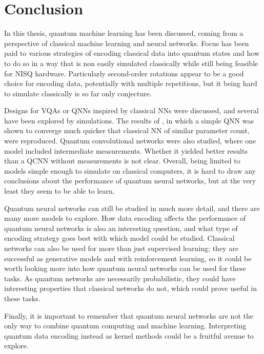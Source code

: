 \chapter{Conclusion}
\label{chap:conclusion}
In this thesis, quantum machine learning has been discussed, coming from a perspective of classical machine learning and neural networks.
Focus has been paid to various strategies of encoding classical data into quantum states and how to do so in a way that is non easily simulated classically while still being feasible for NISQ hardware.
Particularly second-order rotations appear to be a good choice for encoding data, potentially with multiple repetitions, but it being hard to simulate classically is so far only conjecture.

Designs for VQAs or QNNs inspired by classical NNs were discussed, and several have been explored by simulations.
The results of \cite{abbas2021}, in which a simple QNN was shown to converge much quicker that classical NN of similar parameter count, were reproduced.
Quantum convolutional networks were also studied, where one model included intermediate measurements.
Whether it yielded better results than a QCNN without measurements is not clear.
Overall, being limited to models simple enough to simulate on classical computers, it is hard to draw any conclusions about the performance of quantum neural networks, but at the very least they seem to be able to learn.

Quantum neural networks can still be studied in much more detail, and there are many more models to explore.
How data encoding affects the performance of quantum neural networks is also an interesting question, and what type of encoding strategy goes best with which model could be studied.
Classical networks can also be used for more than just supervised learning; they are successful as generative models and with reinforcement learning, so it could be worth looking more into how quantum neural networks can be used for these tasks.
As quantum networks are necessarily probabilistic, they could have interesting properties that classical networks do not, which could prove useful in these tasks.

Finally, it is important to remember that quantum neural networks are not the only way to combine quantum computing and machine learning.
Interpreting quantum data encoding instead as kernel methods could be a fruitful avenue to explore.


